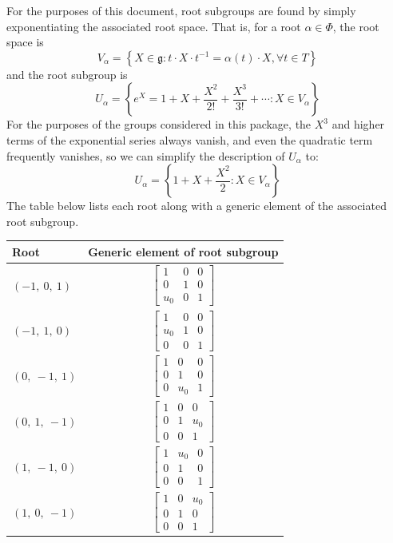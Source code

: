 \documentclass[11pt]{article}
\newcommand{\noi}{\noindent}
\newcommand{\inv}{^{-1}}
\newcommand{\lb}{\left\{}
\newcommand{\rb}{\right\}}
\newcommand{\frakg}{\mathfrak{g}}
\theoremstyle{definition}
\begin{document}
\noi For the purposes of this document, root subgroups are found by simply exponentiating the associated root space. That is, for a root $\alpha \in \Phi$, the root space is
\[
	V_\alpha = \lb X \in \frakg : t \cdot X \cdot t \inv = \alpha(t) \cdot X, \forall t \in T \rb
\]
and the root subgroup is
\[
	U_\alpha = \lb e^X = 1 + X + \frac{X^2}{2!} + \frac{X^3}{3!} + \cdots : X \in V_\alpha \rb
\]
For the purposes of the groups considered in this package, the $X^3$ and higher terms of the exponential series always vanish, and even the quadratic term frequently vanishes, so we can simplify the description of $U_\alpha$ to:
\[
	U_\alpha = \lb 1 + X + \frac{X^2}{2} : X \in V_\alpha \rb
\]
The table below lists each root along with a generic element of the associated root subgroup.

\noindent \begin{longtable}{|l|c|}
    \hline
    \textbf{Root} & \textbf{Generic element of root subgroup} \\
    \hline
    \endhead
    $\left( -1, \  0, \  1\right)$ & ${\left[\begin{matrix}1 & 0 & 0\\0 & 1 & 0\\u_{0} & 0 & 1\end{matrix}\right]}$ \\
    \hline
    $\left( -1, \  1, \  0\right)$ & ${\left[\begin{matrix}1 & 0 & 0\\u_{0} & 1 & 0\\0 & 0 & 1\end{matrix}\right]}$ \\
    \hline
    $\left( 0, \  -1, \  1\right)$ & ${\left[\begin{matrix}1 & 0 & 0\\0 & 1 & 0\\0 & u_{0} & 1\end{matrix}\right]}$ \\
    \hline
    $\left( 0, \  1, \  -1\right)$ & ${\left[\begin{matrix}1 & 0 & 0\\0 & 1 & u_{0}\\0 & 0 & 1\end{matrix}\right]}$ \\
    \hline
    $\left( 1, \  -1, \  0\right)$ & ${\left[\begin{matrix}1 & u_{0} & 0\\0 & 1 & 0\\0 & 0 & 1\end{matrix}\right]}$ \\
    \hline
    $\left( 1, \  0, \  -1\right)$ & ${\left[\begin{matrix}1 & 0 & u_{0}\\0 & 1 & 0\\0 & 0 & 1\end{matrix}\right]}$ \\
    \hline
\end{longtable}
\end{document}
